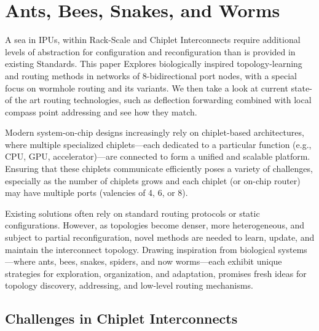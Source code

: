 \documentclass[../../../OAE-SPEC-MAIN.tex]{subfiles}
\begin{document}
\section{Ants, Bees, Snakes, and Worms}

A sea in IPUs, within Rack-Scale and Chiplet Interconnects require additional levels of abstraction for configuration and reconfiguration than is provided in existing Standards.   This paper  Explores biologically inspired topology-learning and routing methods in networks of 8-bidirectional port nodes, with a special focus on wormhole routing and its variants. We then take a look at current state-of the art routing technologies, such as deflection forwarding combined with local compass point addressing and see how they match.

Modern system-on-chip designs increasingly rely on chiplet-based architectures, where multiple specialized chiplets—each dedicated to a particular function (e.g., CPU, GPU, accelerator)—are connected to form a unified and scalable platform. Ensuring that these chiplets communicate efficiently poses a variety of challenges, especially as the number of chiplets grows and each chiplet (or on-chip router) may have multiple ports (valencies of 4, 6, or 8).

Existing solutions often rely on standard routing protocols or static configurations. However, as topologies become denser, more heterogeneous, and subject to partial reconfiguration, novel methods are needed to learn, update, and maintain the interconnect topology. Drawing inspiration from biological systems—where ants, bees, snakes, spiders, and now worms—each exhibit unique strategies for exploration, organization, and adaptation, promises fresh ideas for topology discovery, addressing, and low-level routing mechanisms.

\subsection{Challenges in Chiplet Interconnects}
\end{document}

